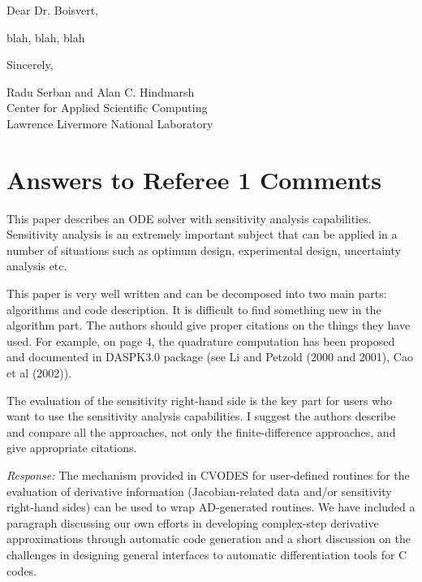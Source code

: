 \batchmode

\begin{letter}



\opening{Dear Dr. Boisvert,}

blah, blah, blah

\closing{Sincerely,}

Radu Serban and Alan C. Hindmarsh\\
Center for Applied Scientific Computing\\
Lawrence Livermore National Laboratory

\end{letter}

\newpage
\section{Answers to Referee 1 Comments}

This paper describes an ODE solver with sensitivity analysis 
capabilities. Sensitivity analysis is an extremely important
subject that can be applied in a number of situations such as
optimum design, experimental design, uncertainty analysis etc. 

This paper is very well written and can be decomposed into two
main parts: algorithms and code description. It is difficult to
find something new in the algorithm part. The authors should
give proper citations on the things they have used. For example, on
page 4, the quadrature computation has been proposed and
documented in DASPK3.0 package (see Li and Petzold (2000 and
2001), Cao et al (2002)). 

The evaluation of the sensitivity right-hand side is the key
part for users who want to use the sensitivity analysis
capabilities. I suggest the authors describe and compare all the
approaches, not only the finite-difference approaches, and give
appropriate citations. 

{\em Response:}
The mechanism provided in CVODES for user-defined routines
for the evaluation of derivative information (Jacobian-related data
and/or sensitivity right-hand sides) can be used to wrap AD-generated
routines.
We have included a paragraph discussing our own efforts 
in developing complex-step derivative approximations through automatic 
code generation and a short discussion on the challenges in 
designing general interfaces to automatic differentiation tools
for C codes.

